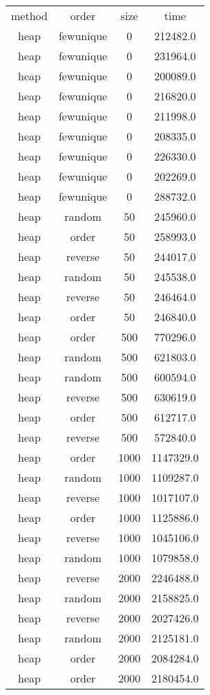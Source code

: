 \begin{table}
\begin{tabular}{cccc}
method & order & size & time \\
heap & fewunique & 0 & 212482.0 \\
heap & fewunique & 0 & 231964.0 \\
heap & fewunique & 0 & 200089.0 \\
heap & fewunique & 0 & 216820.0 \\
heap & fewunique & 0 & 211998.0 \\
heap & fewunique & 0 & 208335.0 \\
heap & fewunique & 0 & 226330.0 \\
heap & fewunique & 0 & 202269.0 \\
heap & fewunique & 0 & 288732.0 \\
heap & random & 50 & 245960.0 \\
heap & order & 50 & 258993.0 \\
heap & reverse & 50 & 244017.0 \\
heap & random & 50 & 245538.0 \\
heap & reverse & 50 & 246464.0 \\
heap & order & 50 & 246840.0 \\
heap & order & 500 & 770296.0 \\
heap & random & 500 & 621803.0 \\
heap & random & 500 & 600594.0 \\
heap & reverse & 500 & 630619.0 \\
heap & order & 500 & 612717.0 \\
heap & reverse & 500 & 572840.0 \\
heap & order & 1000 & 1147329.0 \\
heap & random & 1000 & 1109287.0 \\
heap & reverse & 1000 & 1017107.0 \\
heap & order & 1000 & 1125886.0 \\
heap & reverse & 1000 & 1045106.0 \\
heap & random & 1000 & 1079858.0 \\
heap & reverse & 2000 & 2246488.0 \\
heap & random & 2000 & 2158825.0 \\
heap & reverse & 2000 & 2027426.0 \\
heap & random & 2000 & 2125181.0 \\
heap & order & 2000 & 2084284.0 \\
heap & order & 2000 & 2180454.0 \\

\end{tabular}
\end{table}
